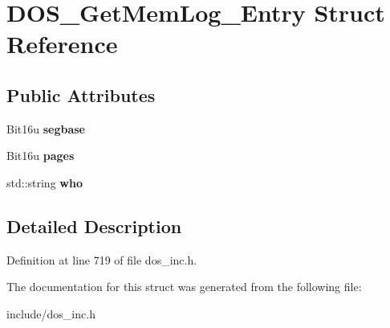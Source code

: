 \hypertarget{structDOS__GetMemLog__Entry}{\section{D\-O\-S\-\_\-\-Get\-Mem\-Log\-\_\-\-Entry Struct Reference}
\label{structDOS__GetMemLog__Entry}
}
\subsection*{Public Attributes}
\begin{DoxyCompactItemize}
\item 
\hypertarget{structDOS__GetMemLog__Entry_ae0b40132debcc642571b174128f14a0c}{Bit16u {\bfseries segbase}}\label{structDOS__GetMemLog__Entry_ae0b40132debcc642571b174128f14a0c}

\item 
\hypertarget{structDOS__GetMemLog__Entry_a1687425bea21c2dba1d7dcf5137ac5e3}{Bit16u {\bfseries pages}}\label{structDOS__GetMemLog__Entry_a1687425bea21c2dba1d7dcf5137ac5e3}

\item 
\hypertarget{structDOS__GetMemLog__Entry_ad8a1936e9a6a49aa924a0fc9e585d18f}{std\-::string {\bfseries who}}\label{structDOS__GetMemLog__Entry_ad8a1936e9a6a49aa924a0fc9e585d18f}

\end{DoxyCompactItemize}


\subsection{Detailed Description}


Definition at line 719 of file dos\-\_\-inc.\-h.



The documentation for this struct was generated from the following file\-:\begin{DoxyCompactItemize}
\item 
include/dos\-\_\-inc.\-h\end{DoxyCompactItemize}
